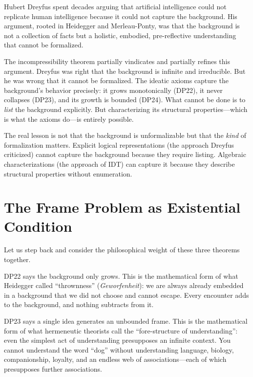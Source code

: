 \begin{interpretation}
\label{interp:dreyfus-limits}
Hubert Dreyfus spent decades arguing that artificial intelligence could
not replicate human intelligence because it could not capture the
background.  His argument, rooted in Heidegger and Merleau-Ponty, was
that the background is not a collection of facts but a holistic,
embodied, pre-reflective understanding that cannot be formalized.

The incompressibility theorem partially vindicates and partially
refines this argument.  Dreyfus was right that the background is
infinite and irreducible.  But he was wrong that it cannot be
formalized.  The ideatic axioms capture the background's behavior
precisely: it grows monotonically (DP22), it never collapses (DP23),
and its growth is bounded (DP24).  What cannot be done is to
\emph{list} the background explicitly.  But characterizing its
structural properties---which is what the axioms do---is entirely
possible.

The real lesson is not that the background is unformalizable but that
the \emph{kind} of formalization matters.  Explicit logical
representations (the approach Dreyfus criticized) cannot capture the
background because they require listing.  Algebraic characterizations
(the approach of IDT) can capture it because they describe structural
properties without enumeration.
\end{interpretation}

\section{The Frame Problem as Existential Condition}

Let us step back and consider the philosophical weight of these three
theorems together.

DP22 says the background only grows.  This is the mathematical form of
what Heidegger called ``thrownness'' (\textit{Geworfenheit}): we are
always already embedded in a background that we did not choose and
cannot escape.  Every encounter adds to the background, and nothing
subtracts from it.

DP23 says a single idea generates an unbounded frame.  This is the
mathematical form of what hermeneutic theorists call the
``fore-structure of understanding'': even the simplest act of
understanding presupposes an infinite context.  You cannot understand
the word ``dog'' without understanding language, biology, companionship,
loyalty, and an endless web of associations---each of which presupposes
further associations.

